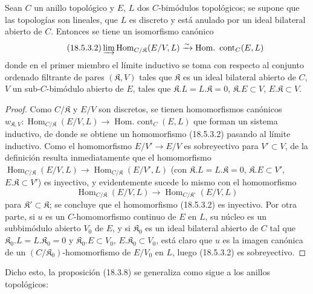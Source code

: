 \begin{lemma}[18.5.3.1]
\label{0.18.5.3.1-fr}
Sean $C$ un anillo topológico y $E$, $L$ dos $C$-bimódulos topológicos;
se supone que las topologías son lineales, que $L$ es discreto y está anulado
por un ideal bilateral abierto de $C$. Entonces se tiene un isomorfismo canónico
\begin{equation}
\label{0.18.5.3.2-fr}
\tag{18.5.3.2}
  \varinjlim\operatorname{Hom}_{C/\mathfrak K}(E/V,L)
  \xrightarrow{\sim}\operatorname{Hom.\ cont}_C(E,L)
\end{equation}
donde en el primer miembro el límite inductivo se toma con respecto al conjunto
ordenado filtrante de pares $(\mathfrak K,V)$ tales que $\mathfrak K$ es un
ideal bilateral abierto de $C$, $V$ un sub-$C$-bimódulo abierto de $E$, tales que
$\mathfrak K.L=L.\mathfrak K=0$, $\mathfrak K.E\subset V$,
$E.\mathfrak K\subset V$.
\end{lemma}

\begin{proof}
Como $C/\mathfrak K$ y $E/V$ son discretos, se tienen homomorfismos
canónicos
$w_{\mathfrak K,V}:\operatorname{Hom}_{C/\mathfrak K}(E/V,L)\longrightarrow\operatorname{Hom.\ cont}_C(E,L)$
que forman un sistema inductivo, de donde se obtiene un homomorfismo (18.5.3.2) pasando al
límite inductivo. Como el homomorfismo $E/V'\to E/V$ es sobreyectivo para
$V'\subset V$, de la definición resulta inmediatamente que el homomorfismo
$\operatorname{Hom}_{C/\mathfrak K}(E/V,L)\longrightarrow\operatorname{Hom}_{C/\mathfrak K}(E/V',L)$
(con $\mathfrak K.L=L.\mathfrak K=0$, $\mathfrak K.E\subset V'$,
$E.\mathfrak K\subset V'$) es inyectivo, y evidentemente sucede lo mismo con
el homomorfismo
\[
  \operatorname{Hom}_{C/\mathfrak K}(E/V,L)
  \longrightarrow\operatorname{Hom}_{C/\mathfrak K'}(E/V,L)
\]
para $\mathfrak K'\subset\mathfrak K$; se concluye que el homomorfismo
(18.5.3.2) es inyectivo. Por otra parte, si $u$ es un $C$-homomorfismo continuo
de $E$ en $L$, su núcleo es un subbimódulo abierto $V_0$ de $E$, y si
$\mathfrak K_0$ es un ideal bilateral abierto de $C$ tal que
$\mathfrak K_0.L=L.\mathfrak K_0=0$ y $\mathfrak K_0.E\subset V_0$,
$E.\mathfrak K_0\subset V_0$, está claro que $u$ es la imagen canónica de un
$(C/\mathfrak K_0)$-homomorfismo de $E/V_0$ en $L$, luego (18.5.3.2) es
sobreyectivo.
\end{proof}

Dicho esto, la proposición (18.3.8) se generaliza como sigue a los anillos
topológicos:

